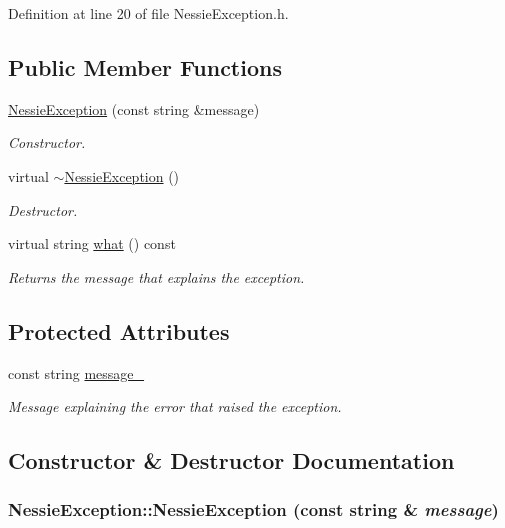 Definition at line 20 of file NessieException.h.\subsection*{Public Member Functions}
\begin{CompactItemize}
\item 
\hyperlink{class_nessie_exception_bf222307ce3e9e9a18068a5a96de9203}{NessieException} (const string \&message)
\begin{CompactList}\small\item\em Constructor. \item\end{CompactList}\item 
virtual \hyperlink{class_nessie_exception_19f44d2725dd53e2f10505a88e5773f2}{$\sim$NessieException} ()
\begin{CompactList}\small\item\em Destructor. \item\end{CompactList}\item 
virtual string \hyperlink{class_nessie_exception_ec94145f2fd5febb7ca0b7587652b777}{what} () const 
\begin{CompactList}\small\item\em Returns the message that explains the exception. \item\end{CompactList}\end{CompactItemize}
\subsection*{Protected Attributes}
\begin{CompactItemize}
\item 
\hypertarget{class_nessie_exception_e8256407b687ddec0fdabd9969f3465e}{
const string \hyperlink{class_nessie_exception_e8256407b687ddec0fdabd9969f3465e}{message\_\-}}
\label{class_nessie_exception_e8256407b687ddec0fdabd9969f3465e}

\begin{CompactList}\small\item\em Message explaining the error that raised the exception. \item\end{CompactList}\end{CompactItemize}


\subsection{Constructor \& Destructor Documentation}
\hypertarget{class_nessie_exception_bf222307ce3e9e9a18068a5a96de9203}{
\subsubsection[NessieException]{\setlength{\rightskip}{0pt plus 5cm}NessieException::NessieException (const string \& {\em message})}}
\label{class_nessie_exception_bf222307ce3e9e9a18068a5a96de9203}


